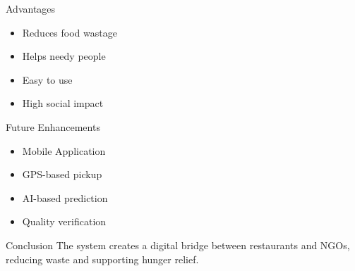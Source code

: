 \documentclass{beamer}
\begin{document}
\begin{frame}{Advantages}
\begin{itemize}
\item Reduces food wastage
\item Helps needy people
\item Easy to use
\item High social impact
\end{itemize}
\end{frame}

\begin{frame}{Future Enhancements}
\begin{itemize}
\item Mobile Application
\item GPS-based pickup
\item AI-based prediction
\item Quality verification
\end{itemize}
\end{frame}

\begin{frame}{Conclusion}
The system creates a digital bridge between restaurants and NGOs, reducing waste and supporting hunger relief.
\end{frame}
\end{document}
